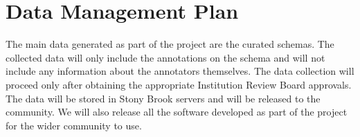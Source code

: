 \documentclass[a4paper,11pt,onecolumn]{article}
\begin{document}
\section*{Data Management Plan}
The main data generated as part of the project are the curated schemas. The collected data will only include the annotations on the schema and will not include any information about the annotators themselves. The data collection will proceed only after obtaining the appropriate Institution Review Board approvals. The data will be stored in Stony Brook servers and will be released to the community. We will also release all the software developed as part of the project for the wider community to use. 
\end{document}
